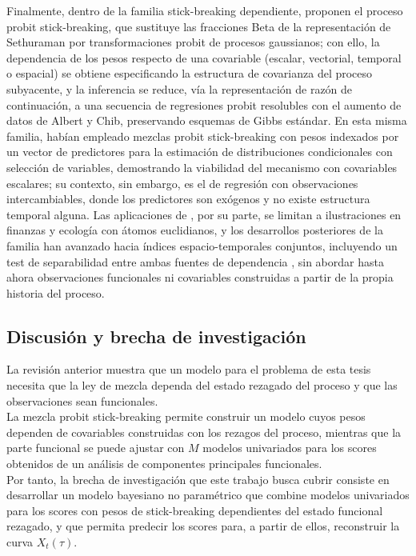 Finalmente, dentro de la familia stick-breaking dependiente, \citet{03_01_rodriguez2011probit} proponen el proceso probit stick-breaking, que sustituye las fracciones Beta de la representación de Sethuraman por transformaciones probit de procesos gaussianos; con ello, la dependencia de los pesos respecto de una covariable (escalar, vectorial, temporal o espacial) se obtiene especificando la estructura de covarianza del proceso subyacente, y la inferencia se reduce, vía la representación de razón de continuación, a una secuencia de regresiones probit resolubles con el aumento de datos de Albert y Chib, preservando esquemas de Gibbs estándar. En esta misma familia, \citet{03_02_chung2009nonparametric} habían empleado mezclas probit stick-breaking con pesos indexados por un vector de predictores para la estimación de distribuciones condicionales con selección de variables, demostrando la viabilidad del mecanismo con covariables escalares; su contexto, sin embargo, es el de regresión con observaciones intercambiables, donde los predictores son exógenos y no existe estructura temporal alguna. Las aplicaciones de \citet{03_01_rodriguez2011probit}, por su parte, se limitan a ilustraciones en finanzas y ecología con átomos euclidianos, y los desarrollos posteriores de la familia han avanzado hacia índices espacio-temporales conjuntos, incluyendo un test de separabilidad entre ambas fuentes de dependencia \cite{03_01_grazian2025spatiotemporal}, sin abordar hasta ahora observaciones funcionales ni covariables construidas a partir de la propia historia del proceso.
 
\subsection{Discusión y brecha de investigación}
\label{03_02_01_discusion_brecha}
La revisión anterior muestra que un modelo para el problema de esta tesis necesita que la ley de mezcla dependa del estado rezagado del proceso y que las observaciones sean funcionales.\\

La mezcla probit stick-breaking permite construir un modelo cuyos pesos dependen de covariables construidas con los rezagos del proceso, mientras que la parte funcional se puede ajustar con $M$ modelos univariados para los scores obtenidos de un análisis de componentes principales funcionales.\\

Por tanto, la brecha de investigación que este trabajo busca cubrir consiste en desarrollar un modelo bayesiano no paramétrico que combine modelos univariados para los scores con pesos de stick-breaking dependientes del estado funcional rezagado, y que permita predecir los scores para, a partir de ellos, reconstruir la curva $X_t(\tau)$.\\

